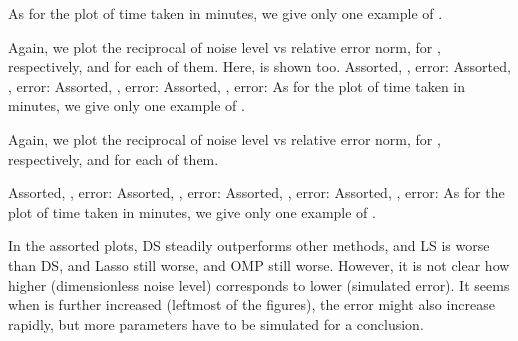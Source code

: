 As for the plot of time taken in minutes, we give only one example of .
%
\blank [big]

\stopsubsection

\startsubsection [title={Plots of DS only}]

Again, we plot the reciprocal of noise level vs relative error norm, for , respectively, and  for each of them.
Here, \m {\T {\chi}} is shown too.
%
Assorted, , error:
\blank [big]
%
Assorted, , error:
\blank [big]
%
Assorted, , error:
\blank [big]
%
Assorted, , error:
\blank [big]
%
As for the plot of time taken in minutes, we give only one example of .
%
\blank [big]

\stopsubsection

\startsubsection [title={Plots of OMP only}]

Again, we plot the reciprocal of noise level vs relative error norm, for , respectively, and  for each of them.

%
Assorted, , error:
\blank [big]
%
Assorted, , error:
\blank [big]
%
Assorted, , error:
\blank [big]
%
Assorted, , error:
\blank [big]
%
As for the plot of time taken in minutes, we give only one example of .
%
\blank [big]

\stopsubsection

\startsubsection [title={Discussion}]

In the assorted plots, DS steadily outperforms other methods, and LS is worse than DS, and Lasso still worse, and OMP still worse.
However, it is not clear how higher \m {\s} (dimensionless noise level) corresponds to lower \m {\T {\chi}} (simulated error).
It seems when \m {\s} is further increased (leftmost of the figures), the error might also increase rapidly, but more parameters have to be simulated for a conclusion.

